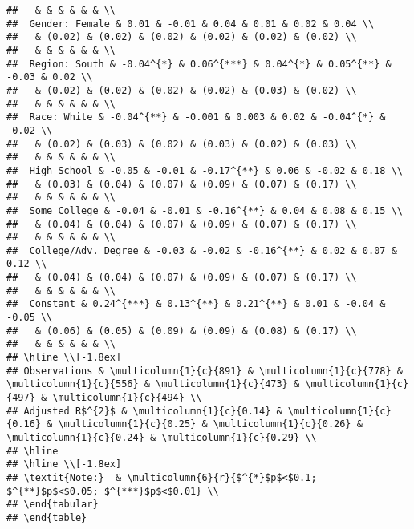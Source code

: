 \documentclass[
]{article}
\begin{document}
\begin{verbatim}
##   & & & & & & \\ 
##  Gender: Female & 0.01 & -0.01 & 0.04 & 0.01 & 0.02 & 0.04 \\ 
##   & (0.02) & (0.02) & (0.02) & (0.02) & (0.02) & (0.02) \\ 
##   & & & & & & \\ 
##  Region: South & -0.04^{*} & 0.06^{***} & 0.04^{*} & 0.05^{**} & -0.03 & 0.02 \\ 
##   & (0.02) & (0.02) & (0.02) & (0.02) & (0.03) & (0.02) \\ 
##   & & & & & & \\ 
##  Race: White & -0.04^{**} & -0.001 & 0.003 & 0.02 & -0.04^{*} & -0.02 \\ 
##   & (0.02) & (0.03) & (0.02) & (0.03) & (0.02) & (0.03) \\ 
##   & & & & & & \\ 
##  High School & -0.05 & -0.01 & -0.17^{**} & 0.06 & -0.02 & 0.18 \\ 
##   & (0.03) & (0.04) & (0.07) & (0.09) & (0.07) & (0.17) \\ 
##   & & & & & & \\ 
##  Some College & -0.04 & -0.01 & -0.16^{**} & 0.04 & 0.08 & 0.15 \\ 
##   & (0.04) & (0.04) & (0.07) & (0.09) & (0.07) & (0.17) \\ 
##   & & & & & & \\ 
##  College/Adv. Degree & -0.03 & -0.02 & -0.16^{**} & 0.02 & 0.07 & 0.12 \\ 
##   & (0.04) & (0.04) & (0.07) & (0.09) & (0.07) & (0.17) \\ 
##   & & & & & & \\ 
##  Constant & 0.24^{***} & 0.13^{**} & 0.21^{**} & 0.01 & -0.04 & -0.05 \\ 
##   & (0.06) & (0.05) & (0.09) & (0.09) & (0.08) & (0.17) \\ 
##   & & & & & & \\ 
## \hline \\[-1.8ex] 
## Observations & \multicolumn{1}{c}{891} & \multicolumn{1}{c}{778} & \multicolumn{1}{c}{556} & \multicolumn{1}{c}{473} & \multicolumn{1}{c}{497} & \multicolumn{1}{c}{494} \\ 
## Adjusted R$^{2}$ & \multicolumn{1}{c}{0.14} & \multicolumn{1}{c}{0.16} & \multicolumn{1}{c}{0.25} & \multicolumn{1}{c}{0.26} & \multicolumn{1}{c}{0.24} & \multicolumn{1}{c}{0.29} \\ 
## \hline 
## \hline \\[-1.8ex] 
## \textit{Note:}  & \multicolumn{6}{r}{$^{*}$p$<$0.1; $^{**}$p$<$0.05; $^{***}$p$<$0.01} \\ 
## \end{tabular} 
## \end{table}
\end{verbatim}
\end{document}
